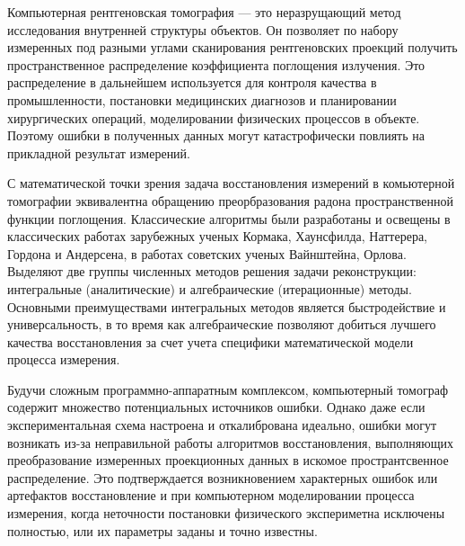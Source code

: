 {\actualityandprogress}

Компьютерная рентгеновская томография --- это неразрущающий метод исследования внутренней структуры объектов.
Он позволяет по набору измеренных под разными углами сканирования рентгеновских проекций получить пространственное распределение коэффициента поглощения излучения.
Это распределение в дальнейшем используется для контроля качества в промышленности, постановки медицинских диагнозов и планировании хирургических операций, моделировании физических процессов в объекте.
Поэтому ошибки в полученных данных могут катастрофически повлиять на прикладной результат измерений.

С математической точки зрения задача восстановления измерений в комьютерной томографии эквивалентна обращению преорбразования радона пространственной функции поглощения. 
Классические алгоритмы были разработаны и освещены в классических работах зарубежных ученых Кормака, Хаунсфилда, Наттерера, Гордона и Андерсена, в работах советских ученых Вайнштейна, Орлова.
Выделяют две группы численных методов решения задачи реконструкции: интегральные (аналитические) и алгебраические (итерационные) методы.
Основными преимуществами интегральных методов является быстродействие и универсальность, в то время как алгебраические позволяют добиться лучшего качества восстановления за счет учета специфики математической модели процесса измерения.

Будучи сложным программно-аппаратным комплексом, компьютерный томограф содержит множество потенциальных источников ошибки.
Однако даже если экспериментальная схема настроена и откалибрована идеально, ошибки могут возникать из-за неправильной работы алгоритмов восстановления, выполняющих преобразование измеренных проекционных данных в искомое пространтсвенное распределение.
Это подтверждается возникновением характерных ошибок или артефактов восстановление и при компьютерном моделировании процесса измерения, когда неточности постановки физического экспериметна исключены полностью, или их параметры заданы и точно известны.

